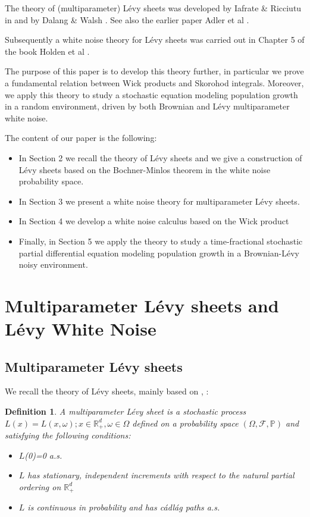 \documentclass[12pt]{article}%
\newtheorem{definition}[theorem]{Definition}
\numberwithin{equation}{section}
\def\P{\mathbb{P}}
\def\R{\mathbb{R}}
\def\F{\mathcal{F}}
\begin{document}
The theory of (multiparameter) L\' evy sheets was developed by Iafrate \& Ricciutu  in \cite{IR} and by Dalang \& Walsh \cite{DW}. See also the earlier paper Adler et al  \cite{AMSW}. 

Subsequently a white noise theory for L\' evy sheets was carried out in Chapter 5 of the book Holden et al \cite{HOUZ}. 

The purpose of this paper is to develop this theory further, in particular we prove a fundamental relation between Wick products and
Skorohod integrals. Moreover, we apply this theory to study a stochastic  equation modeling population growth in a random environment, driven by both Brownian and
L\' evy multiparameter white noise.

The content of our paper is the following:
\begin{itemize}
    \item 
    In Section 2 we recall the theory of L\' evy sheets and we give a construction of L\' evy sheets based on the Bochner-Minlos theorem in the white noise probability space.
    \item 
    In Section 3 we present a white noise theory for multiparameter L\' evy sheets.
    \item 
    In Section 4 we develop a white noise calculus based on the Wick product
    \item 
    Finally, in Section 5 we apply the theory to study a time-fractional stochastic partial differential equation modeling population growth in a Brownian-L\' evy noisy environment.
\end{itemize}


\section{Multiparameter L\' evy sheets and L\' evy White Noise}


\subsection{Multiparameter L\'{e}vy sheets}


We recall the theory of L\' evy sheets, mainly based on \cite{IR}, \cite{DW}:

\begin{definition}
  A \emph{multiparameter L\'{e}vy sheet} is a stochastic process $L(x)=L(x,\omega); x \in \R_+^d,\omega \in \Omega$ defined on a probability space $(\Omega,\F,\P)$ and satisfying the following conditions:
\begin{itemize}
\item
    $L$(0)=0 a.s.
\item
$L$ has stationary, independent increments with respect to the natural partial ordering on $\R_+^d$
\item
$L$ is continuous in probability and has c\'adl\'ag paths a.s. 
\end{itemize}
\end{definition}
\end{document}
